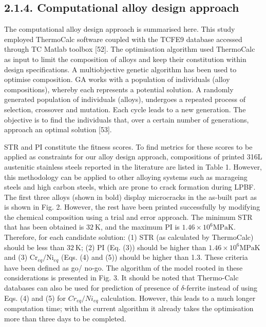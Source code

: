 \documentclass[10pt]{article}
\begin{document}
\subsection*{2.1.4. Computational alloy design approach}
The computational alloy design approach is summarised here. This study employed ThermoCalc software coupled with the TCFE9 database accessed through TC Matlab toolbox [52]. The optimisation algorithm used ThermoCalc as input to limit the composition of alloys and keep their constitution within design specifications. A multiobjective genetic algorithm has been used to optimise composition. GA works with a population of individuals (alloy compositions), whereby each represents a potential solution. A randomly generated population of individuals (alloys), undergoes a repeated process of selection, crossover and mutation. Each cycle leads to a new generation. The objective is to find the individuals that, over a certain number of generations, approach an optimal solution [53].

STR and PI constitute the fitness scores. To find metrics for these scores to be applied as constraints for our alloy design approach, compositions of printed 316L austenitic stainless steels reported in the literature are listed in Table 1. However, this methodology can be applied to other alloying systems such as marageing steels and high carbon steels, which are prone to crack formation during LPBF. The first three alloys (shown in bold) display microcracks in the as-built part as is shown in Fig. 2. However, the rest have been printed successfully by modifying the chemical composition using a trial and error approach. The minimum STR that has been obtained is $32 \mathrm{~K}$, and the maximum PI is $1.46 \times 10^{6} \mathrm{MPa} \mathrm{K}$. Therefore, for each candidate solution: (1) STR (as calculated by ThermoCalc) should be less than $32 \mathrm{~K}$; (2) PI (Eq. (3)) should be higher than $1.46 \times 10^{6} \mathrm{MPa} \mathrm{K}$ and (3) $\mathrm{Cr}_{e q} / \mathrm{Ni}_{e q}$ (Eqs. (4) and (5)) should be higher than 1.3. These criteria have been defined as go/ no-go. The algorithm of the model rooted in these considerations is presented in Fig. 3. It should be noted that Thermo-Calc databases can also be used for prediction of presence of $\delta$-ferrite instead of using Eqs. (4) and (5) for $C r_{e q} / N i_{e q}$ calculation. However, this leads to a much longer computation time; with the current algorithm it already takes the optimisation more than three days to be completed.
\end{document}
